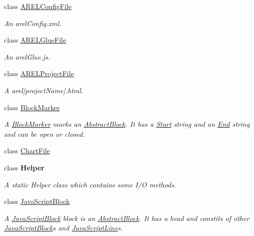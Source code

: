 \begin{DoxyCompactItemize}
class \hyperlink{class_a_rdev_kit_1_1_model_1_1_project_1_1_file_1_1_a_r_e_l_config_file}{A\-R\-E\-L\-Config\-File}
\begin{DoxyCompactList}\small\item\em An arel\-Config.\-xml. \end{DoxyCompactList}\item 
class \hyperlink{class_a_rdev_kit_1_1_model_1_1_project_1_1_file_1_1_a_r_e_l_glue_file}{A\-R\-E\-L\-Glue\-File}
\begin{DoxyCompactList}\small\item\em An arel\-Glue.\-js. \end{DoxyCompactList}\item 
class \hyperlink{class_a_rdev_kit_1_1_model_1_1_project_1_1_file_1_1_a_r_e_l_project_file}{A\-R\-E\-L\-Project\-File}
\begin{DoxyCompactList}\small\item\em A arel\mbox{[}project\-Name\mbox{]}.html. \end{DoxyCompactList}\item 
class \hyperlink{class_a_rdev_kit_1_1_model_1_1_project_1_1_file_1_1_block_marker}{Block\-Marker}
\begin{DoxyCompactList}\small\item\em A \hyperlink{class_a_rdev_kit_1_1_model_1_1_project_1_1_file_1_1_block_marker}{Block\-Marker} marks an \hyperlink{class_a_rdev_kit_1_1_model_1_1_project_1_1_file_1_1_abstract_block}{Abstract\-Block}. It has a \hyperlink{class_a_rdev_kit_1_1_model_1_1_project_1_1_file_1_1_block_marker_a7764ae600714a07a74b8ddf55f1a59d5}{Start} string and an \hyperlink{class_a_rdev_kit_1_1_model_1_1_project_1_1_file_1_1_block_marker_a3672477b3c409c07c7189a57fbd004c4}{End} string and can be open or closed. \end{DoxyCompactList}\item 
class \hyperlink{class_a_rdev_kit_1_1_model_1_1_project_1_1_file_1_1_chart_file}{Chart\-File}
\item 
class {\bfseries Helper}
\begin{DoxyCompactList}\small\item\em A static Helper class which contains some I/\-O methods. \end{DoxyCompactList}\item 
class \hyperlink{class_a_rdev_kit_1_1_model_1_1_project_1_1_file_1_1_java_script_block}{Java\-Script\-Block}
\begin{DoxyCompactList}\small\item\em A \hyperlink{class_a_rdev_kit_1_1_model_1_1_project_1_1_file_1_1_java_script_block}{Java\-Script\-Block} block is an \hyperlink{class_a_rdev_kit_1_1_model_1_1_project_1_1_file_1_1_abstract_block}{Abstract\-Block}. It has a head and constits of other \hyperlink{class_a_rdev_kit_1_1_model_1_1_project_1_1_file_1_1_java_script_block}{Java\-Script\-Block}s and \hyperlink{class_a_rdev_kit_1_1_model_1_1_project_1_1_file_1_1_java_script_line}{Java\-Script\-Line}s. \end{DoxyCompactList}\item 

\end{DoxyCompactItemize}
